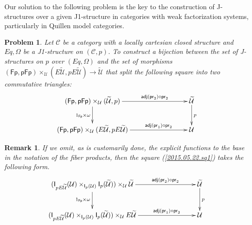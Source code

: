 \documentclass[12pt]{article}
\numberwithin{equation}{section}
\newenvironment{eq}{\begin{equation}}{\end{equation}}
\newtheorem{remark}[proposition]{Remark}
\newtheorem{problem}[proposition]{Problem}
\newcommand{\sr}{\rightarrow}
\newcommand{\wt}{\widetilde}
\newcommand{\C}{{\mathcal C}}  %
\newcommand{\id}{1}            %
\newcommand{\U}{\mathcal{U}}
\newcommand{\I}{\mathsf{I}}
\newcommand{\Fp}{\mathsf{Fp}}
\newcommand{\pFp}{\mathsf{pFp}}
\newcommand{\pr}{\mathsf{pr}}
\newcommand{\adj}{\mathsf{adj}}
\begin{document}
Our solution to the following problem is the key to the construction of
J-structures over a given J1-structure in categories with weak factorization
systems, particularly in Quillen model categories.

\begin{problem}
\label{2015.05.12.l1} Let $\C$ be a category with a locally cartesian
closed structure and $Eq,\Omega$ be a J1-structure on $({\C},p)$. To
construct a bijection between the set of J-structures on $p$ over $(Eq,\Omega)$
and the set of morphisms $(\Fp,\pFp)\times_\U(E\wt{\U},pE\wt{\U})\sr \wt{\U}$ that
split the following square into two commutative triangles:
%
\begin{eq}\label{2015.05.22.sq1}
\begin{xy}
          \xymatrix@C=7pc{ (\Fp,\pFp)\times_\U(\wt{\U},p) \ar[r]^-{\adj(\pr_2)\circ
              \pr_2} \ar[d]_{\id_{\Fp}\times \omega} & \wt{\U}
            \ar[d]^{p}\\ (\Fp,\pFp)\times_\U(E\wt{\U},pE\wt{\U})
            \ar[r]^-{\adj(\pr_1)\circ \pr_2} & \U }
\end{xy}
\end{eq}%
%
\end{problem}
%
\begin{remark}\rm
If we omit, as is customarily done, the explicit functions to the base in the
notation of the fiber products, then the square (\ref{2015.05.22.sq1}) takes the
following form.
%
\begin{eq}\label{2017.08.16.sq1}
\begin{xy}
          \xymatrix@C=7pc{ (\I_{pE\wt{\U}}(\U)\times_{\I_p(\U)}
            \I_p(\wt{\U}))\times_\U\wt{\U} \ar[r]^-{\adj(\pr_2)\circ \pr_2}
            \ar[d]_{\id_{\Fp}\times \omega} & \wt{\U}
            \ar[d]^{p}\\ (\I_{pE\wt{\U}}(\U)\times_{\I_p(\U)} \I_p(\wt{\U}))\times_\U
            E\wt{\U} \ar[r]^-{\adj(\pr_1)\circ \pr_2} & \U }
\end{xy}
\end{eq}%




\end{remark}
%
\end{document}
